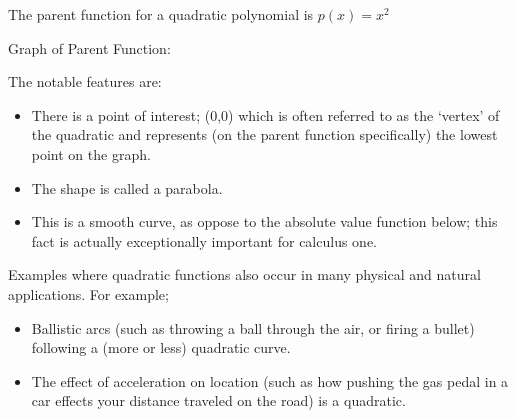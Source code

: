 \documentclass{ximera}
\begin{document}
        \begin{description}
            \item[Parent Function:] The parent function for a quadratic polynomial is $p(x) = x^2$\\
            \begin{minipage}{\textwidth}\item[Graph of Parent Function:]\hspace*{0pt} \\
                \begin{center}
                \end{center}
            \end{minipage}
            
            \item[Notable Features of Graph:] The notable features are:
            \begin{itemize}
                \item There is a point of interest; (0,0) which is often referred to as the `vertex' of the quadratic and represents (on the parent function specifically) the lowest point on the graph.
                \item The shape is called a parabola.%
                \item This is a smooth curve, as oppose to the absolute value function below; this fact is actually exceptionally important for calculus one.
            \end{itemize}
            
            \item[Example usage:] Examples where quadratic functions also occur in many physical and natural applications. For example;
            \begin{itemize}
                \item Ballistic arcs (such as throwing a ball through the air, or firing a bullet) following a (more or less) quadratic curve. 
                \item The effect of acceleration on location (such as how pushing the gas pedal in a car effects your distance traveled on the road) is a quadratic.
            \end{itemize}
        \end{description}
        
\end{document}
